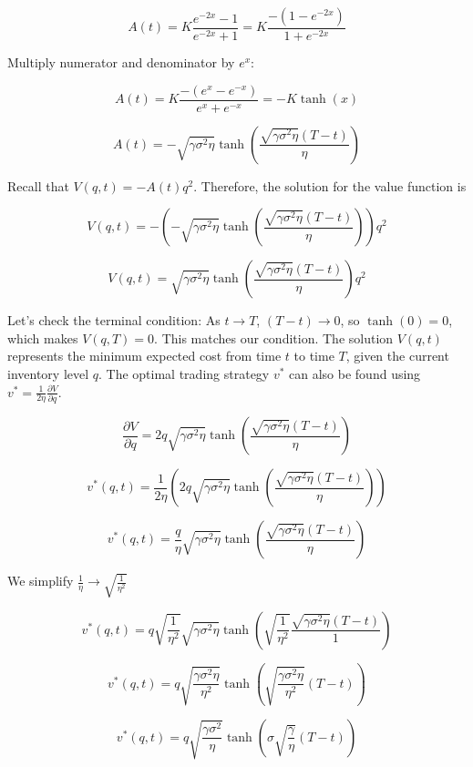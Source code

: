 $$A(t) = K \frac{e^{-2x} - 1}{e^{-2x} + 1} = K \frac{-(1 - e^{-2x})}{1 + e^{-2x}}$$

Multiply numerator and denominator by $e^x$:

$$A(t) = K \frac{-(e^x - e^{-x})}{e^x + e^{-x}} = -K \tanh(x)$$

$$A(t) = -\sqrt{\gamma \sigma^2 \eta} \tanh\left(\frac{\sqrt{\gamma \sigma^2 \eta}(T-t)}{\eta}\right)$$

Recall that $V(q, t) = -A(t) q^2$. Therefore, the solution for the value function is

$$V(q, t) = - \left( -\sqrt{\gamma \sigma^2 \eta} \tanh\left(\frac{\sqrt{\gamma \sigma^2 \eta}(T-t)}{\eta}\right) \right) q^2$$

\begin{equation}\label{eq:value_function_analytical}\tag{4}
V(q, t) = \sqrt{\gamma \sigma^2 \eta} \tanh\left(\frac{\sqrt{\gamma \sigma^2 \eta}(T-t)}{\eta}\right) q^2
\end{equation}

Let’s check the terminal condition: As $t \to T$, $(T-t) \to 0$, so $\tanh(0) = 0$, which makes $V(q, T) = 0$. This matches our condition. The solution $V(q,t)$ represents the minimum expected cost from time $t$ to time $T$, given the current inventory level $q$. The optimal trading strategy $v^*$ can also be found using $v^* = \frac{1}{2\eta} \frac{\partial V}{\partial q}$.

$$\frac{\partial V}{\partial q} = 2q \sqrt{\gamma \sigma^2 \eta} \tanh\left(\frac{\sqrt{\gamma \sigma^2 \eta}(T-t)}{\eta}\right)$$

$$v^*(q,t) = \frac{1}{2\eta} \left( 2q \sqrt{\gamma \sigma^2 \eta} \tanh\left(\frac{\sqrt{\gamma \sigma^2 \eta}(T-t)}{\eta}\right) \right)$$

$$v^*(q,t) = \frac{q}{\eta} \sqrt{\gamma \sigma^2 \eta} \tanh\left(\frac{\sqrt{\gamma \sigma^2 \eta}(T-t)}{\eta}\right)$$

We simplify $\frac{1}{\eta} \rightarrow \sqrt{\frac{1}{\eta^2}}$

$$v^*(q,t) = q \sqrt{\frac{1}{\eta^2}} \sqrt{\gamma \sigma^2 \eta} \tanh\left( \sqrt{\frac{1}{\eta^2}} \frac{\sqrt{\gamma \sigma^2 \eta}(T-t)}{1} \right)$$

$$v^*(q,t) = q \sqrt{\frac{\gamma \sigma^2 \eta} {\eta^2}} \tanh\left( \sqrt{\frac{\gamma \sigma^2 \eta}{\eta^2}} (T-t)
\right)$$

\begin{equation}\label{eq:optimal_control_analytical}\tag{5}
v^*(q,t) = q \sqrt{\frac{\gamma \sigma^2}{\eta}} \tanh\left(
\sigma \sqrt{ \frac{\gamma}{\eta}} (T-t)\right)
\end{equation}

